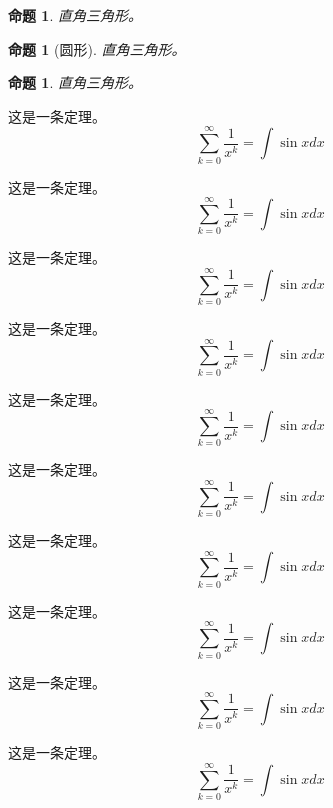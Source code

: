 \documentclass[oneside]{fduthesis}
\begin{document}
\newtheorem{prop}[thm]{命题}

\begin{prop}
  直角三角形。
\end{prop}
\begin{prop}[圆形]
  直角三角形。
\end{prop}
\begin{prop}
  直角三角形。
\end{prop}

\begin{p}
这是一条定理。
\[ \sum_{k=0}^{\infty} \frac{1}{x^k} = \int \sin x dx \]
\end{p}

\begin{mm}[明早]
这是一条定理。
\[ \sum_{k=0}^{\infty} \frac{1}{x^k} = \int \sin x dx \]
\end{mm}

\begin{fduc}
这是一条定理。
\[ \sum_{k=0}^{\infty} \frac{1}{x^k} = \int \sin x dx \]
\end{fduc}

\begin{fdub}
这是一条定理。
\[ \sum_{k=0}^{\infty} \frac{1}{x^k} = \int \sin x dx \]
\end{fdub}

\begin{mb}
这是一条定理。
\[ \sum_{k=0}^{\infty} \frac{1}{x^k} = \int \sin x dx \]
\end{mb}

\begin{cb}
这是一条定理。
\[ \sum_{k=0}^{\infty} \frac{1}{x^k} = \int \sin x dx \]
\end{cb}


\begin{np}
这是一条定理。
\[ \sum_{k=0}^{\infty} \frac{1}{x^k} = \int \sin x dx \]
\end{np}

\begin{nmm}[明天一早]
这是一条定理。
\[ \sum_{k=0}^{\infty} \frac{1}{x^k} = \int \sin x dx \]
\end{nmm}

\begin{nfduc}
这是一条定理。
\[ \sum_{k=0}^{\infty} \frac{1}{x^k} = \int \sin x dx \]
\end{nfduc}

\begin{nfdub}
这是一条定理。
\[ \sum_{k=0}^{\infty} \frac{1}{x^k} = \int \sin x dx \]
\end{nfdub}
\end{document}
